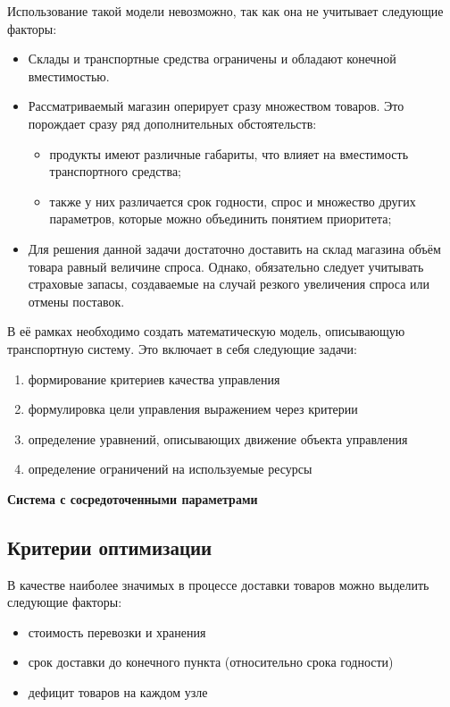 Использование такой модели невозможно, так как она не учитывает следующие факторы:
\begin{itemize}
	\item Склады и транспортные средства ограничены и обладают конечной вместимостью.
	\item Рассматриваемый магазин оперирует сразу множеством товаров. Это порождает сразу ряд дополнительных обстоятельств:
	\begin{itemize}
		\item продукты имеют различные габариты, что влияет на вместимость транспортного средства;
		\item также у них различается срок годности, спрос и множество других параметров, которые можно объединить понятием приоритета;
	\end{itemize}
	\item Для решения данной задачи достаточно доставить на склад магазина объём товара равный величине спроса. Однако, обязательно следует учитывать страховые запасы, создаваемые на случай резкого увеличения спроса или отмены поставок.
\end{itemize}


В её рамках необходимо создать математическую модель, описывающую транспортную систему. Это включает в себя следующие задачи:
\begin{enumerate}
	\item формирование критериев качества управления
	\item формулировка цели управления выражением через критерии
	\item определение уравнений, описывающих движение объекта управления
	\item определение ограничений на используемые ресурсы
\end{enumerate}

\textbf{Система с сосредоточенными параметрами}



\subsection{Критерии оптимизации}
В качестве наиболее значимых в процессе доставки товаров можно выделить следующие факторы:
\begin{itemize}
	\item стоимость перевозки и хранения
	\item срок доставки до конечного пункта (относительно срока годности)
	\item дефицит товаров на каждом узле
\end{itemize}

\pagebreak